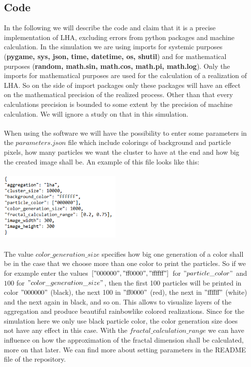 \documentclass[12pt,a4paper]{scrartcl}
\newcommand{\1}{\mathbbm{1}}
\theoremstyle{definition}
\numberwithin{equation}{section}
\begin{document}
\subsection{Code}
In the following we will describe the code and claim that it is a precise implementation of LHA, excluding errors from python packages and machine calculation. In the simulation we are using imports for systemic purposes (\textbf{pygame, sys, json, time, datetime, os, shutil}) and for mathematical purposes (\textbf{random, math.sin, math.cos, math.pi, math.log}). Only the imports for mathematical purposes are used for the calculation of a realization of LHA. So on the side of import packages only these packages will have an effect on the mathematical precision of the realized process. Other than that every calculations precision is bounded to some extent by the precision of machine calculation. We will ignore a study on that in this simulation. \\
\\When using the software we will have the possibility to enter some parameters in the $\mathit{parameters.json}$ file which include colorings of background and particle pixels, how many particles we want the cluster to have at the end and how big the created image shall be. An example of this file looks like this:\\
\\
\includegraphics[height=3.33cm]{images/code-snippets/parameters.png} \\
\\
The value $\mathit{color\_generation\_size}$ specifies how big one generation of a color shall be in the case that we choose more than one color to print the particles. So if we for example enter the values $["000000","\text{ff0000}","\text{ffffff}"]$ for $"particle\_color"$ and $100$ for $"color\_generation\_size"$, then the first 100 particles will be printed in color $"000000"$ (black), the next 100 in $"\text{ff}0000"$ (red), the next in $"\text{ffffff}"$ (white) and the next again in black, and so on. This allows to visualize layers of the aggregation and produce beautiful rainbowlike colored realizations. Since for the simulation here we only use black particle color, the color generation size does not have any effect in this case. With the $\mathit{fractal\_calculation\_range}$ we can have influence on how the approximation of the fractal dimension shall be calculated, more on that later. We can find more about setting parameters in the README file of the repository. \\
\end{document}
